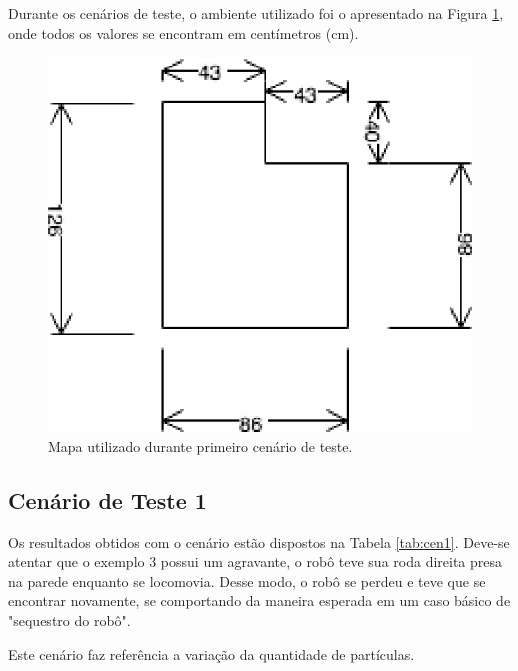 Durante os cenários de teste, o ambiente utilizado foi o apresentado na Figura \ref{img:map1}, onde todos os
valores se encontram em centímetros (cm).

\begin{figure}[H]
	\centering
	\includegraphics[scale=1.3]{figuras/map1.eps}
	\caption[Primeiro Cenário de Teste]{Mapa utilizado durante primeiro cenário de teste.}
	\label{img:map1}
\end{figure}

\subsection{Cenário de Teste 1}

Os resultados obtidos com o cenário estão dispostos na Tabela \ref{tab:cen1}. Deve-se atentar que o exemplo 3 possui um agravante, o
robô teve sua roda direita presa na parede enquanto se locomovia. Desse modo, o robô se perdeu e teve que se encontrar novamente, se comportando
da maneira esperada em um caso básico de "sequestro do robô".

Este cenário faz referência a variação da quantidade de partículas.

